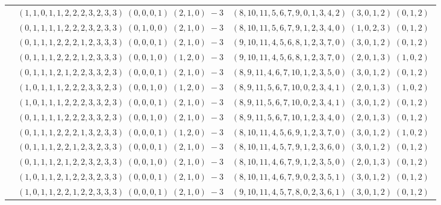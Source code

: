 \documentclass[11pt]{article}
\begin{document}
\begin{longtable}[l]{|c|c|c|}
 \cline{2-3} 
 & $(1 ,1 ,0 ,1 ,1 ,2 ,2 ,2 ,3 ,2 ,3 ,3) \;(0 ,0 ,0 ,1) \;(2 ,1 ,0) \;-3$ & $(8 ,10 ,11 ,5 ,6 ,7 ,9 ,0 ,1 ,3 ,4 ,2) \;(3 ,0 ,1 ,2) \;(0 ,1 ,2) \;$\\ 
 \cline{2-3} 
 & $(0 ,1 ,1 ,1 ,1 ,2 ,2 ,2 ,3 ,2 ,3 ,3) \;(0 ,1 ,0 ,0) \;(2 ,1 ,0) \;-3$ & $(8 ,10 ,11 ,5 ,6 ,7 ,9 ,1 ,2 ,3 ,4 ,0) \;(1 ,0 ,2 ,3) \;(0 ,1 ,2) \;$\\ 
 \cline{2-3} 
 & $(0 ,1 ,1 ,1 ,2 ,2 ,2 ,1 ,2 ,3 ,3 ,3) \;(0 ,0 ,0 ,1) \;(2 ,1 ,0) \;-3$ & $(9 ,10 ,11 ,4 ,5 ,6 ,8 ,1 ,2 ,3 ,7 ,0) \;(3 ,0 ,1 ,2) \;(0 ,1 ,2) \;$\\ 
 \cline{2-3} 
 & $(0 ,1 ,1 ,1 ,2 ,2 ,2 ,1 ,2 ,3 ,3 ,3) \;(0 ,0 ,1 ,0) \;(1 ,2 ,0) \;-3$ & $(9 ,10 ,11 ,4 ,5 ,6 ,8 ,1 ,2 ,3 ,7 ,0) \;(2 ,0 ,1 ,3) \;(1 ,0 ,2) \;$\\ 
 \cline{2-3} 
 & $(0 ,1 ,1 ,1 ,2 ,1 ,2 ,2 ,3 ,3 ,2 ,3) \;(0 ,0 ,0 ,1) \;(2 ,1 ,0) \;-3$ & $(8 ,9 ,11 ,4 ,6 ,7 ,10 ,1 ,2 ,3 ,5 ,0) \;(3 ,0 ,1 ,2) \;(0 ,1 ,2) \;$\\ 
 \cline{2-3} 
 & $(1 ,0 ,1 ,1 ,1 ,2 ,2 ,2 ,3 ,3 ,2 ,3) \;(0 ,0 ,1 ,0) \;(1 ,2 ,0) \;-3$ & $(8 ,9 ,11 ,5 ,6 ,7 ,10 ,0 ,2 ,3 ,4 ,1) \;(2 ,0 ,1 ,3) \;(1 ,0 ,2) \;$\\ 
 \cline{2-3} 
 & $(1 ,0 ,1 ,1 ,1 ,2 ,2 ,2 ,3 ,3 ,2 ,3) \;(0 ,0 ,0 ,1) \;(2 ,1 ,0) \;-3$ & $(8 ,9 ,11 ,5 ,6 ,7 ,10 ,0 ,2 ,3 ,4 ,1) \;(3 ,0 ,1 ,2) \;(0 ,1 ,2) \;$\\ 
 \cline{2-3} 
 & $(0 ,1 ,1 ,1 ,1 ,2 ,2 ,2 ,3 ,3 ,2 ,3) \;(0 ,0 ,1 ,0) \;(2 ,1 ,0) \;-3$ & $(8 ,9 ,11 ,5 ,6 ,7 ,10 ,1 ,2 ,3 ,4 ,0) \;(2 ,0 ,1 ,3) \;(0 ,1 ,2) \;$\\ 
 \cline{2-3} 
 & $(0 ,1 ,1 ,1 ,2 ,2 ,2 ,1 ,3 ,2 ,3 ,3) \;(0 ,0 ,0 ,1) \;(1 ,2 ,0) \;-3$ & $(8 ,10 ,11 ,4 ,5 ,6 ,9 ,1 ,2 ,3 ,7 ,0) \;(3 ,0 ,1 ,2) \;(1 ,0 ,2) \;$\\ 
 \cline{2-3} 
 & $(0 ,1 ,1 ,1 ,2 ,2 ,1 ,2 ,3 ,2 ,3 ,3) \;(0 ,0 ,0 ,1) \;(2 ,1 ,0) \;-3$ & $(8 ,10 ,11 ,4 ,5 ,7 ,9 ,1 ,2 ,3 ,6 ,0) \;(3 ,0 ,1 ,2) \;(0 ,1 ,2) \;$\\ 
 \cline{2-3} 
 & $(0 ,1 ,1 ,1 ,2 ,1 ,2 ,2 ,3 ,2 ,3 ,3) \;(0 ,0 ,1 ,0) \;(2 ,1 ,0) \;-3$ & $(8 ,10 ,11 ,4 ,6 ,7 ,9 ,1 ,2 ,3 ,5 ,0) \;(2 ,0 ,1 ,3) \;(0 ,1 ,2) \;$\\ 
 \cline{2-3} 
 & $(1 ,0 ,1 ,1 ,2 ,1 ,2 ,2 ,3 ,2 ,3 ,3) \;(0 ,0 ,0 ,1) \;(2 ,1 ,0) \;-3$ & $(8 ,10 ,11 ,4 ,6 ,7 ,9 ,0 ,2 ,3 ,5 ,1) \;(3 ,0 ,1 ,2) \;(0 ,1 ,2) \;$\\ 
 \cline{2-3} 
 & $(1 ,0 ,1 ,1 ,2 ,2 ,1 ,2 ,2 ,3 ,3 ,3) \;(0 ,0 ,0 ,1) \;(2 ,1 ,0) \;-3$ & $(9 ,10 ,11 ,4 ,5 ,7 ,8 ,0 ,2 ,3 ,6 ,1) \;(3 ,0 ,1 ,2) \;(0 ,1 ,2) \;$\\ 

\end{longtable}
\end{document}

